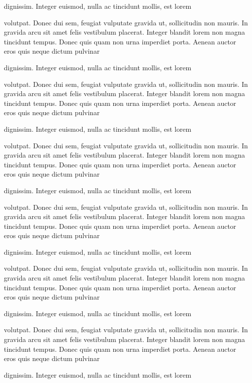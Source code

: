 dignissim. Integer euismod, nulla ac tincidunt mollis, est lorem

volutpat. Donec dui sem, feugiat vulputate gravida ut, sollicitudin
non mauris. In gravida arcu sit amet felis vestibulum placerat.
Integer blandit lorem non magna tincidunt tempus. Donec quis quam non
urna imperdiet porta. Aenean auctor eros quis neque dictum pulvinar

dignissim. Integer euismod, nulla ac tincidunt mollis, est lorem

volutpat. Donec dui sem, feugiat vulputate gravida ut, sollicitudin
non mauris. In gravida arcu sit amet felis vestibulum placerat.
Integer blandit lorem non magna tincidunt tempus. Donec quis quam non
urna imperdiet porta. Aenean auctor eros quis neque dictum pulvinar

dignissim. Integer euismod, nulla ac tincidunt mollis, est lorem

volutpat. Donec dui sem, feugiat vulputate gravida ut, sollicitudin
non mauris. In gravida arcu sit amet felis vestibulum placerat.
Integer blandit lorem non magna tincidunt tempus. Donec quis quam non
urna imperdiet porta. Aenean auctor eros quis neque dictum pulvinar

dignissim. Integer euismod, nulla ac tincidunt mollis, est lorem

volutpat. Donec dui sem, feugiat vulputate gravida ut, sollicitudin
non mauris. In gravida arcu sit amet felis vestibulum placerat.
Integer blandit lorem non magna tincidunt tempus. Donec quis quam non
urna imperdiet porta. Aenean auctor eros quis neque dictum pulvinar

dignissim. Integer euismod, nulla ac tincidunt mollis, est lorem

volutpat. Donec dui sem, feugiat vulputate gravida ut, sollicitudin
non mauris. In gravida arcu sit amet felis vestibulum placerat.
Integer blandit lorem non magna tincidunt tempus. Donec quis quam non
urna imperdiet porta. Aenean auctor eros quis neque dictum pulvinar

dignissim. Integer euismod, nulla ac tincidunt mollis, est lorem

volutpat. Donec dui sem, feugiat vulputate gravida ut, sollicitudin
non mauris. In gravida arcu sit amet felis vestibulum placerat.
Integer blandit lorem non magna tincidunt tempus. Donec quis quam non
urna imperdiet porta. Aenean auctor eros quis neque dictum pulvinar

dignissim. Integer euismod, nulla ac tincidunt mollis, est lorem

